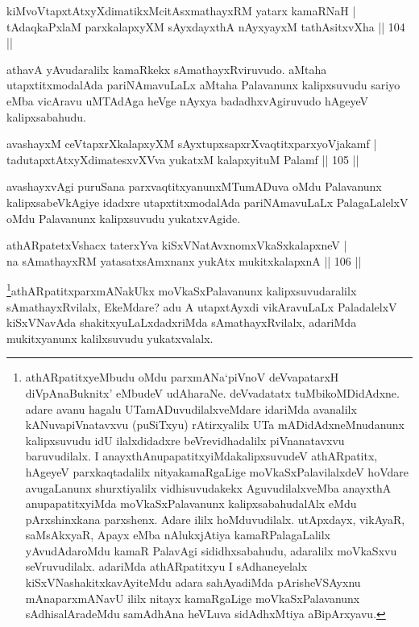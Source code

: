 \begin{shl}
kiMvoVtapxtAtxyXdimatikxMcitAsxmathayxRM yatarx kamaRNaH |\\
tAdaqkaPxlaM parxkalapxyXM sAyxdayxthA nAyxyayxM tathA\s sitxvXha \hfill || 104 ||
\end{shl}

\begin{artha}
athavA yAvudaralilx kamaRkekx sAmathayxRviruvudo. aMtaha utapxtitxmodalAda pariNAmavuLaLx aMtaha Palavanunx kalipxsuvudu sariyo eMba vicAravu uMTAdAga heVge nAyxya badadhxvAgiruvudo hAgeyeV kalipxsabahudu. 
\end{artha}


\begin{shl}
avashayxM ceVtapxrXkalapxyXM sAyxtupxsapxrXvaqtitxparxyoVjakamf |\\
tadutapxtAtxyXdimatesxvXVva yukatxM kalapxyituM Palamf \hfill || 105 ||
\end{shl}

\begin{artha}
avashayxvAgi puruSana parxvaqtitxyanunxMTumADuva oMdu Palavanunx kalipxsabeVkAgiye idadxre utapxtitxmodalAda pariNAmavuLaLx PalagaLalelxV oMdu Palavanunx kalipxsuvudu yukatxvAgide.
\end{artha}


\begin{shl}
athARpatetxVshacx taterxYva kiSxVNatAvxnomxVkaSxkalapxneV |\\
na sAmathayxRM yatasatxsAmxnanx yukAtx mukitxkalapxnA \hfill || 106 ||
\end{shl}

\begin{artha}
\footnote{athARpatitxyeMbudu oMdu parxmANa`piVnoV deVvapatarxH diVpAnaBuknitx' eMbudeV udAharaNe. deVvadatatx tuMbikoMDidAdxne. adare avanu hagalu UTamADuvudilalxveMdare idariMda avanalilx kANuvapiVnatavxvu (puSiTxyu) rAtirxyalilx UTa mADidAdxneMnudanunx kalipxsuvudu idU ilalxdidadxre beVrevidhadalilx piVnanatavxvu baruvudilalx. I anayxthAnupapatitxyiMdakalipxsuvudeV athARpatitx, hAgeyeV parxkaqtadalilx nityakamaRgaLige moVkaSxPalavilalxdeV hoVdare avugaLanunx shurxtiyalilx vidhisuvudakekx AguvudilalxveMba anayxthA anupapatitxyiMda moVkaSxPalavanunx kalipxsabahudalAlx eMdu pArxshinxkana parxshenx. Adare ililx hoMduvudilalx. utApxdayx, vikAyaR, saMsAkxyaR, Apayx eMba nAlukxjAtiya kamaRPalagaLalilx yAvudAdaroMdu kamaR PalavAgi sididhxsabahudu, adaralilx moVkaSxvu seVruvudilalx. adariMda athARpatitxyu I sAdhaneyelalx kiSxVNashakitxkavAyiteMdu adara sahAyadiMda pArisheVSAyxnu mAnaparxmANavU ililx nitayx kamaRgaLige moVkaSxPalavanunx sAdhisalAradeMdu samAdhAna heVLuva sidAdhxMtiya aBipArxyavu.}athARpatitxparxmANakUkx moVkaSxPalavanunx kalipxsuvudaralilx sAmathayxRvilalx, EkeMdare? adu A utapxtAyxdi vikAravuLaLx PaladalelxV kiSxVNavAda shakitxyuLaLxdadxriMda sAmathayxRvilalx, adariMda mukitxyanunx kalilxsuvudu yukatxvalalx.
\end{artha}

